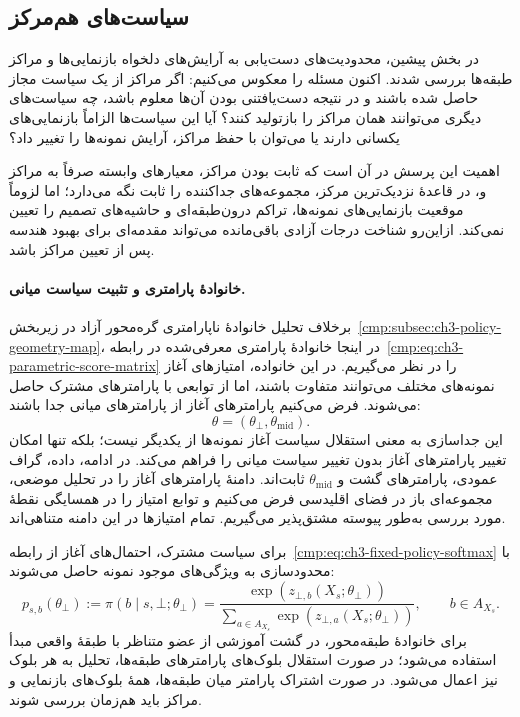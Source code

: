 \subsection{سیاست‌های هم‌مرکز}
\label{cmp:subsec:ch3-geometry-parametric-fibers}

در بخش پیشین، محدودیت‌های دست‌یابی به آرایش‌های دلخواه بازنمایی‌ها و مراکز طبقه‌ها بررسی شدند. اکنون مسئله را معکوس می‌کنیم: اگر مراکز از یک سیاست مجاز حاصل شده باشند و در نتیجه دست‌یافتنی بودن آن‌ها معلوم باشد، چه سیاست‌های دیگری می‌توانند همان مراکز را بازتولید کنند؟ آیا این سیاست‌ها الزاماً بازنمایی‌های یکسانی دارند یا می‌توان با حفظ مراکز، آرایش نمونه‌ها را تغییر داد؟

اهمیت این پرسش در آن است که ثابت بودن مراکز، معیارهای وابسته صرفاً به مراکز و، در قاعدهٔ نزدیک‌ترین مرکز، مجموعه‌های جداکننده را ثابت نگه می‌دارد؛ اما لزوماً موقعیت بازنمایی‌های نمونه‌ها، تراکم درون‌طبقه‌ای و حاشیه‌های تصمیم را تعیین نمی‌کند. ازاین‌رو شناخت درجات آزادی باقی‌مانده می‌تواند مقدمه‌ای برای بهبود هندسه پس از تعیین مراکز باشد.

\paragraph{خانوادهٔ پارامتری و تثبیت سیاست میانی.}
برخلاف تحلیل خانوادهٔ ناپارامتری گره‌محور آزاد در زیربخش~\ref{cmp:subsec:ch3-policy-geometry-map}، در اینجا خانوادهٔ پارامتری معرفی‌شده در رابطه~\eqref{cmp:eq:ch3-parametric-score-matrix} را در نظر می‌گیریم. در این خانواده، امتیازهای آغاز نمونه‌های مختلف می‌توانند متفاوت باشند، اما از توابعی با پارامترهای مشترک حاصل می‌شوند. فرض می‌کنیم پارامترهای آغاز از پارامترهای میانی جدا باشند:
\begin{equation}\label{cmp:eq:ch3-geometry-parametric-start-split}
\theta=(\theta_{\bot},\theta_{\mathrm{mid}}).
\end{equation}
این جداسازی به معنی استقلال سیاست آغاز نمونه‌ها از یکدیگر نیست؛ بلکه تنها امکان تغییر پارامترهای آغاز بدون تغییر سیاست میانی را فراهم می‌کند. در ادامه، داده، گراف عمودی، پارامترهای گشت و $\theta_{\mathrm{mid}}$ ثابت‌اند. دامنهٔ پارامترهای آغاز را در تحلیل موضعی، مجموعه‌ای باز در فضای اقلیدسی فرض می‌کنیم و توابع امتیاز را در همسایگی نقطهٔ مورد بررسی به‌طور پیوسته مشتق‌پذیر می‌گیریم. تمام امتیازها در این دامنه متناهی‌اند.

برای سیاست مشترک، احتمال‌های آغاز از رابطه~\eqref{cmp:eq:ch3-fixed-policy-softmax} با محدودسازی به ویژگی‌های موجود نمونه حاصل می‌شوند:
\begin{equation}\label{cmp:eq:ch3-geometry-parametric-start-probs}
p_{s,b}(\theta_\bot):=\pi(b\mid s,\bot;\theta_\bot)
=\frac{\exp(z_{\bot,b}(X_s;\theta_\bot))}
{\sum_{a\in A_{X_s}}\exp(z_{\bot,a}(X_s;\theta_\bot))},
\qquad b\in A_{X_s}.
\end{equation}
برای خانوادهٔ طبقه‌محور، در گشت آموزشی از عضو متناظر با طبقهٔ واقعی مبدأ استفاده می‌شود؛ در صورت استقلال بلوک‌های پارامترهای طبقه‌ها، تحلیل به هر بلوک نیز اعمال می‌شود. در صورت اشتراک پارامتر میان طبقه‌ها، همهٔ بلوک‌های بازنمایی و مراکز باید هم‌زمان بررسی شوند.

